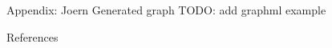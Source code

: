 \documentclass[aspectratio=169,10pt]{beamer}
\begin{document}
\begin{frame}{Appendix: Joern Generated graph}
  TODO: add graphml example 
\end{frame}

\begin{frame}[allowframebreaks]{References}
  \scriptsize
  \printbibliography[heading=none]
\end{frame}
\end{document}
